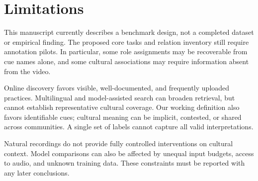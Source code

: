 \section*{Limitations}
\label{sec:limitations}

This manuscript currently describes a benchmark design, not a completed
dataset or empirical finding. The proposed core tasks and relation inventory
still require annotation pilots. In particular, some role assignments may
be recoverable from cue names alone, and some cultural associations may
require information absent from the video.

Online discovery favors visible, well-documented, and frequently uploaded
practices. Multilingual and model-assisted search can broaden retrieval,
but cannot establish representative cultural coverage. Our working
definition also favors identifiable cues; cultural meaning can be implicit,
contested, or shared across communities. A single set of labels cannot
capture all valid interpretations.

Natural recordings do not provide fully controlled interventions on
cultural context. Model comparisons can also be affected by unequal input
budgets, access to audio, and unknown training data. These constraints must
be reported with any later conclusions.
